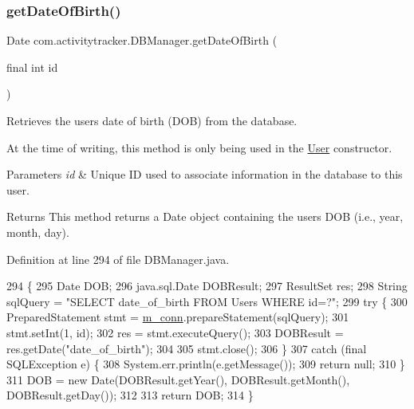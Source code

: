 \subsubsection{\texorpdfstring{get\+Date\+Of\+Birth()}{getDateOfBirth()}}
{\footnotesize\ttfamily Date com.\+activitytracker.\+D\+B\+Manager.\+get\+Date\+Of\+Birth (\begin{DoxyParamCaption}\item[{final int}]{id }\end{DoxyParamCaption})}

Retrieves the user\textquotesingle{}s date of birth (D\+OB) from the database.

At the time of writing, this method is only being used in the \mbox{\hyperlink{classcom_1_1activitytracker_1_1_user}{User}} constructor.


\begin{DoxyParams}{Parameters}
{\em id} & Unique ID used to associate information in the database to this user.\\
\hline
\end{DoxyParams}
\begin{DoxyReturn}{Returns}
This method returns a Date object containing the user\textquotesingle{}s D\+OB (i.\+e., year, month, day). 
\end{DoxyReturn}


Definition at line 294 of file D\+B\+Manager.\+java.


\begin{DoxyCode}
294                                              \{
295         Date DOB;
296         java.sql.Date DOBResult;
297         ResultSet res;
298         String sqlQuery = \textcolor{stringliteral}{"SELECT date\_of\_birth FROM Users WHERE id=?"};
299         \textcolor{keywordflow}{try} \{
300             PreparedStatement stmt = \mbox{\hyperlink{classcom_1_1activitytracker_1_1_d_b_manager_a064088d13ac09eb147fdc19268771521}{m\_conn}}.prepareStatement(sqlQuery);
301             stmt.setInt(1, \textcolor{keywordtype}{id});
302             res = stmt.executeQuery();
303             DOBResult = res.getDate(\textcolor{stringliteral}{"date\_of\_birth"});
304 
305             stmt.close();
306         \}
307         \textcolor{keywordflow}{catch} (\textcolor{keyword}{final} SQLException e) \{
308             System.err.println(e.getMessage());
309             \textcolor{keywordflow}{return} null;
310         \}
311         DOB = \textcolor{keyword}{new} Date(DOBResult.getYear(), DOBResult.getMonth(), DOBResult.getDay());
312 
313         \textcolor{keywordflow}{return} DOB;
314     \}
\end{DoxyCode}
\mbox{\label{classcom_1_1activitytracker_1_1_d_b_manager_a1bef7a6f466db41b1a6da7a502d35bb9}} 
